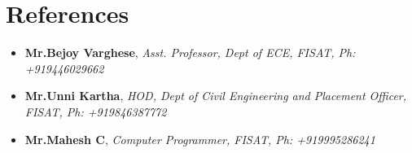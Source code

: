 \documentclass[11pt,a4paper, sans]{moderncv}
\begin{document}
\section{References}
\begin{itemize}
  \item \textbf{Mr.Bejoy Varghese}, \emph{Asst. Professor, Dept of ECE, FISAT, Ph: +919446029662}
  \item \textbf{Mr.Unni Kartha}, \emph{HOD, Dept of Civil Engineering and Placement Officer, FISAT, Ph: +919846387772}
  \item \textbf{Mr.Mahesh C}, \emph{Computer Programmer, FISAT, Ph: +919995286241}
\end{itemize}
\end{document}

